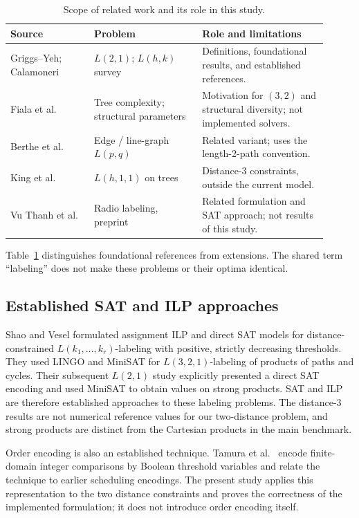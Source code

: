 \begin{table}[htbp]
\centering\small
\caption{Scope of related work and its role in this study.}
\label{tab:related}
\begin{tabular}{>{\raggedright\arraybackslash}p{0.24\linewidth}>{\raggedright\arraybackslash}p{0.31\linewidth}>{\raggedright\arraybackslash}p{0.36\linewidth}}
\toprule
Source & Problem & Role and limitations\\\midrule
Griggs--Yeh; Calamoneri \cite{griggs,calamoneri} & $L(2,1)$; $L(h,k)$ survey & Definitions, foundational results, and established references.\\
Fiala et al.\ \cite{fiala2008trees,fiala2018parameterized} & Tree complexity; structural parameters & Motivation for $(3,2)$ and structural diversity; not implemented solvers.\\
Berthe et al.\ \cite{berthe2023edge} & Edge / line-graph $L(p,q)$ & Related variant; uses the length-2-path convention.\\
King et al.\ \cite{king2010trees} & $L(h,1,1)$ on trees & Distance-3 constraints, outside the current model.\\
Vu Thanh et al.\ \cite{vu2026radio} & Radio labeling, preprint & Related formulation and SAT approach; not results of this study.\\
\bottomrule
\end{tabular}
\end{table}
Table~\ref{tab:related} distinguishes foundational references from extensions.
The shared term ``labeling'' does not make these problems or their optima identical.

\subsection{Established SAT and ILP approaches}
Shao and Vesel \cite{shao2013distance} formulated assignment ILP and direct
SAT models for distance-constrained $L(k_1,\ldots,k_r)$-labeling with positive,
strictly decreasing thresholds. They used LINGO and MiniSAT
for $L(3,2,1)$-labeling of products of paths and cycles. Their subsequent
$L(2,1)$ study \cite{shao2014strong} explicitly presented a direct SAT
encoding and used MiniSAT to obtain values on strong products. SAT and ILP
are therefore established approaches to these labeling problems. The
distance-3 results are not numerical reference values for our two-distance
problem, and strong products are distinct from the Cartesian products in
the main benchmark.

Order encoding is also an established technique. Tamura et al.\
\cite{tamura2009order} encode finite-domain integer comparisons by Boolean
threshold variables and relate the technique to earlier scheduling
encodings. The present study applies this representation to the two
distance constraints and proves the correctness of the implemented
formulation; it does not introduce order encoding itself.


